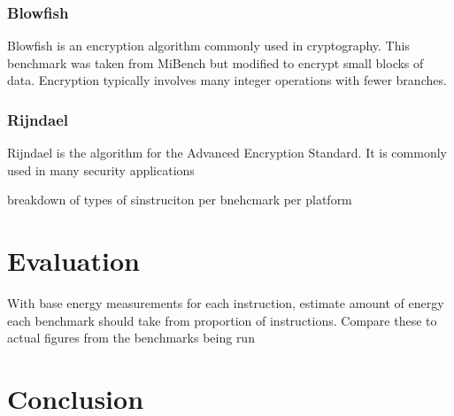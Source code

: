 \documentclass[twocolumn]{article}
\begin{document}
\subsubsection*{Blowfish}

Blowfish is an encryption algorithm commonly used in cryptography. This benchmark was taken from MiBench but modified to encrypt small blocks of data. Encryption typically involves many integer operations with fewer branches.

\subsubsection*{Rijndael}

Rijndael is the algorithm for the Advanced Encryption Standard. It is commonly used in many security applications


breakdown of types of sinstruciton per bnehcmark per platform

\section*{Evaluation}

With base energy measurements for each instruction, estimate amount of energy each benchmark should take from proportion of instructions. Compare these to actual figures from the benchmarks being run

\section*{Conclusion}

\printbibliography
\end{document}
